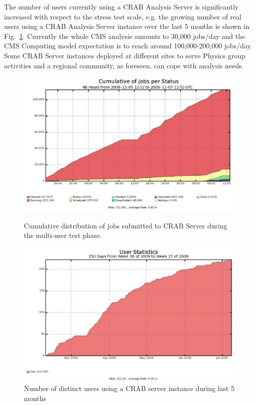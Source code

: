 The number of users currently using a CRAB Analysis Server is significantly 
increased with respect to the stress test scale, e.g. the growing number of real users using a CRAB Analysis Server instance over the last 5 months is shown in Fig.~\ref{fig:CSusers}.
Currently the whole CMS analysis amounts to 30,000 jobs/day and the
CMS Computing model expectation is to reach around 100,000-200,000 jobs/day. 
Some CRAB Server instances deployed at different sites to serve Physics
group activities and a regional community, as foreseen, can cope with
analysis needs.
\begin{figure}
\begin{minipage}{.48\textwidth}
\centering
\includegraphics[width=0.99\textwidth]{MultiUserJobStatus.eps}
\caption{Cumulative distribution of jobs submitted to CRAB Server
  during the multi-user test phase. }
\label{fig:stressmulti}
\end{minipage}
\begin{minipage}{.48\textwidth}
\centering
\includegraphics[width=0.99\textwidth]{CSusersLast5months.eps}
\caption{Number of distinct users using a CRAB server instance during last 5 months}
\label{fig:CSusers}
\end{minipage}
\end{figure}




